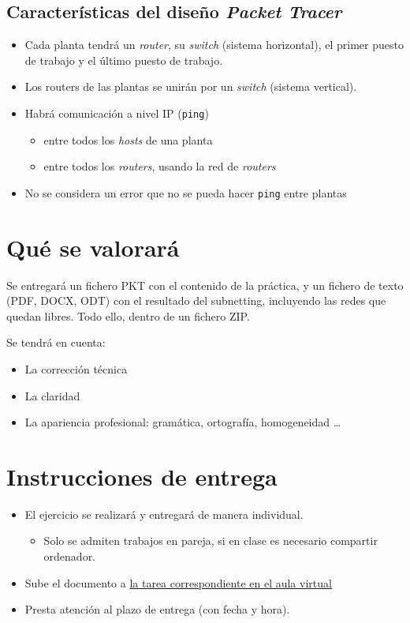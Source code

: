 \documentclass[a4paper]{article}
\begin{document}
\subsection{Características del diseño \emph{Packet Tracer}}
\label{sec:org0000006}
\begin{itemize}
\item Cada planta tendrá un \emph{router}, su \emph{switch} (sistema horizontal), el primer puesto de trabajo y el último puesto de trabajo.
\item Los routers de las plantas se unirán por un \emph{switch} (sistema vertical).
\item Habrá comunicación a nivel IP (\texttt{ping})
\begin{itemize}
\item entre todos los \emph{hosts} de una planta
\item entre todos los \emph{routers}, usando la red de \emph{routers}
\end{itemize}
\item No se considera un error que no se pueda hacer \texttt{ping} entre plantas
\end{itemize}


\section{Qué se valorará}
\label{sec:org000000c}
Se entregará un fichero PKT con el contenido de la práctica, y un fichero de texto (PDF, DOCX, ODT) con el resultado del subnetting, incluyendo las redes que quedan libres. Todo ello, dentro de un fichero ZIP.

Se tendrá en cuenta:
\begin{itemize}
\item La corrección técnica
\item La claridad
\item La apariencia profesional: gramática, ortografía, homogeneidad \ldots
\end{itemize}

\section{Instrucciones de entrega}
\label{sec:org000000f}
\begin{itemize}
\item El ejercicio se realizará y entregará de manera individual.
\begin{itemize}
\item Solo se admiten trabajos en pareja, si en clase es necesario compartir ordenador.
\end{itemize}
\item Sube el documento a \href{https://aulavirtual3.educa.madrid.org/ies.alonsodeavellan.alcala/course/view.php?id=189}{la tarea correspondiente en el aula virtual}
\item Presta atención al plazo de entrega (con fecha y hora).
\end{itemize}
\end{document}
